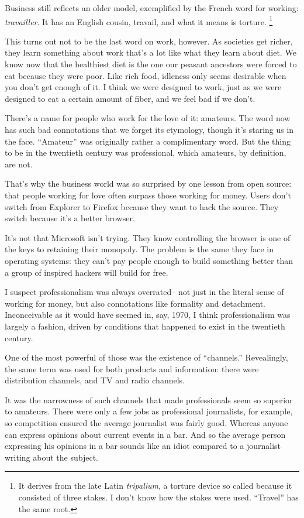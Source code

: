 Business still reflects an older model, exemplified by the French word
for working: \emph{travailler}. It has an English cousin, travail, and
what it means is torture. \footnote{It derives from the late Latin \emph{tripalium}, a torture
device so called because it consisted of three stakes. I don't know how
the stakes were used. ``Travel'' has the same root.}

This turns out not to be the last word on work, however. As societies
get richer, they learn something about work that's a lot like what they
learn about diet. We know now that the healthiest diet is the one our
peasant ancestors were forced to eat because they were poor. Like rich
food, idleness only seems desirable when you don't get enough of it. I
think we were designed to work, just as we were designed to eat a
certain amount of fiber, and we feel bad if we don't.

There's a name for people who work for the love of it: amateurs. The
word now has such bad connotations that we forget its etymology, though
it's staring us in the face. ``Amateur'' was originally rather a
complimentary word. But the thing to be in the twentieth century was
professional, which amateurs, by definition, are not.

That's why the business world was so surprised by one lesson from open
source: that people working for love often surpass those working for
money. Users don't switch from Explorer to Firefox because they want to
hack the source. They switch because it's a better browser.

It's not that Microsoft isn't trying. They know controlling the browser
is one of the keys to retaining their monopoly. The problem is the same
they face in operating systems: they can't pay people enough to build
something better than a group of inspired hackers will build for free.

I suspect professionalism was always overrated-- not just in the literal
sense of working for money, but also connotations like formality and
detachment. Inconceivable as it would have seemed in, say, 1970, I think
professionalism was largely a fashion, driven by conditions that
happened to exist in the twentieth century.

One of the most powerful of those was the existence of ``channels.''
Revealingly, the same term was used for both products and information:
there were distribution channels, and TV and radio channels.

It was the narrowness of such channels that made professionals seem so
superior to amateurs. There were only a few jobs as professional
journalists, for example, so competition ensured the average journalist
was fairly good. Whereas anyone can express opinions about current
events in a bar. And so the average person expressing his opinions in a
bar sounds like an idiot compared to a journalist writing about the
subject.

